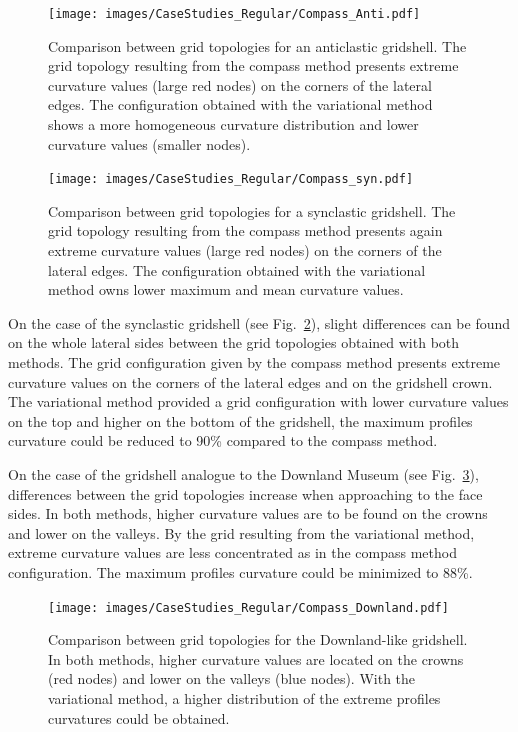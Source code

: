 \documentclass[Thesis.tex]{subfiles}
\begin{document}
\begin{figure}
\centering
\texttt{[image: images/CaseStudies\_Regular/Compass\_Anti.pdf]}
\caption{Comparison between grid topologies for an anticlastic gridshell. The grid topology resulting from the compass method presents extreme curvature values (large red nodes) on the corners of the lateral edges. The configuration obtained with the variational method shows a more homogeneous curvature distribution and lower curvature values (smaller nodes).}
\label{fig:Compass_Anti}
\end{figure}

\begin{figure}
\centering
\texttt{[image: images/CaseStudies\_Regular/Compass\_syn.pdf]}
\caption{Comparison between grid topologies for a synclastic gridshell. The grid topology resulting from the compass method presents again extreme curvature values (large red nodes) on the corners of the lateral edges. The configuration obtained with the variational method owns lower maximum and mean curvature values.}
\label{fig:Compass_Syn}
\end{figure}

On the case of the synclastic gridshell (see Fig.~\ref{fig:Compass_Syn}), slight differences can be found on the whole lateral sides between the grid topologies obtained with both methods. The grid configuration given by the compass method presents extreme curvature values on the corners of the lateral edges and on the gridshell crown. The variational method provided a grid configuration with lower curvature values on the top and higher on the bottom of the gridshell, the  maximum profiles curvature could be reduced to 90\% compared to the compass method.

On the case of the gridshell analogue to the Downland Museum (see Fig.~\ref{fig:Compass_Downland}), differences between the grid topologies increase when approaching to the face sides. In both methods, higher curvature values are to be found on the crowns and lower on the valleys. By the grid resulting from the variational method, extreme curvature values are less concentrated as in the compass method configuration. The maximum profiles curvature could be minimized to 88\%.

\begin{figure}
\centering
\texttt{[image: images/CaseStudies\_Regular/Compass\_Downland.pdf]}
\caption{Comparison between grid topologies for the Downland-like gridshell. In both methods, higher curvature values are located on the crowns (red nodes) and lower on the valleys (blue nodes). With the variational method, a higher distribution of the extreme profiles curvatures could be obtained.}
\label{fig:Compass_Downland}
\end{figure}
\end{document}
